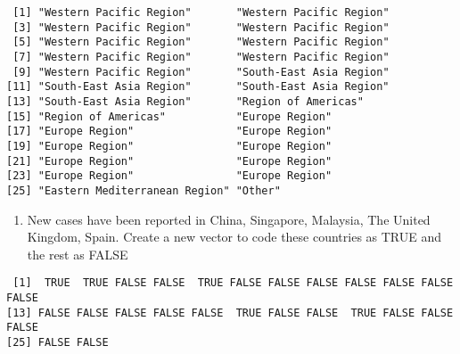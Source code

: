\documentclass[]{article}
\newenvironment{Shaded}{\begin{snugshade}}{\end{snugshade}}
\newcommand{\KeywordTok}[1]{\textcolor[rgb]{0.13,0.29,0.53}{\textbf{#1}}}
\newcommand{\NormalTok}[1]{#1}
\newcommand{\OperatorTok}[1]{\textcolor[rgb]{0.81,0.36,0.00}{\textbf{#1}}}
\newcommand{\StringTok}[1]{\textcolor[rgb]{0.31,0.60,0.02}{#1}}
\providecommand{\tightlist}{%
  \setlength{\itemsep}{0pt}\setlength{\parskip}{0pt}}
\begin{document}
\begin{verbatim}
 [1] "Western Pacific Region"       "Western Pacific Region"      
 [3] "Western Pacific Region"       "Western Pacific Region"      
 [5] "Western Pacific Region"       "Western Pacific Region"      
 [7] "Western Pacific Region"       "Western Pacific Region"      
 [9] "Western Pacific Region"       "South-East Asia Region"      
[11] "South-East Asia Region"       "South-East Asia Region"      
[13] "South-East Asia Region"       "Region of Americas"          
[15] "Region of Americas"           "Europe Region"               
[17] "Europe Region"                "Europe Region"               
[19] "Europe Region"                "Europe Region"               
[21] "Europe Region"                "Europe Region"               
[23] "Europe Region"                "Europe Region"               
[25] "Eastern Mediterranean Region" "Other"                       
\end{verbatim}

\begin{enumerate}
\def\labelenumi{\roman{enumi})}
\setcounter{enumi}{5}
\tightlist
\item
  New cases have been reported in China, Singapore, Malaysia, The United
  Kingdom, Spain. Create a new vector to code these countries as TRUE
  and the rest as FALSE
\end{enumerate}

\begin{Shaded}
\end{Shaded}

\begin{verbatim}
 [1]  TRUE  TRUE FALSE FALSE  TRUE FALSE FALSE FALSE FALSE FALSE FALSE FALSE
[13] FALSE FALSE FALSE FALSE FALSE  TRUE FALSE FALSE  TRUE FALSE FALSE FALSE
[25] FALSE FALSE
\end{verbatim}
\end{document}
